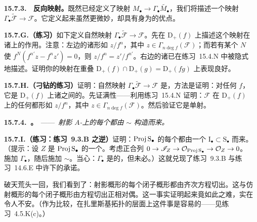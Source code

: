 \textbf{15.7.3.}\ \hard\ \textbf{反向映射。}\quad 既然已经定义了\trSaturation{}映射 $M_\bullet\to\Gamma_\bullet\widetilde{M_\bullet}$，我们将描述一个映射 $\Gamma_\bullet\widetilde{\mathscr{F}}\to\mathscr{F}$。它定义起来虽然更微妙，却具有身为\trIsomorphism{}的优点。

\textbf{15.7.G.（练习）}\quad 如下定义自然映射 $\Gamma_\bullet\widetilde{\mathscr{F}}\to\mathscr{F}$。先在 $\mathrm{D}_+(f)$ 上描述这个映射在诸\trSection{}上的作用。注意：左边的诸\trSection{}形如 $z/f^n$，其中 $z\in\Gamma_{n\deg f}(\mathscr{F})$；而若有某个 $N$ 使 $f^N(f^{n'}z-f^nz')=0$，则 $z/f^n=z'/f^{n'}$。右边的诸\trSection{}已在\mbox{练习~15.4.N} 中被隐式地描述。证明你的映射在重叠 $\mathrm{D}_+(f)\cap\mathrm{D}_+(g)=\mathrm{D}_+(fg)$ 上表现良好。

\textbf{15.7.H.（刁钻的练习）}\quad 证明：自然映射 $\Gamma_\bullet\widetilde{\mathscr{F}}\to\mathscr{F}$ 是\trIsomorphism，方法是证明：对任何 $f$，它是 $\mathrm{D}_+(f)$ 上诸\trSection{}之间的\trIsomorphism。先证满性——利用\mbox{练习~15.4.N} 证明：$\mathscr{F}$ 在 $\mathrm{D}_+(f)$ 上的任何\trSection{}都形如 $z/f^n$，其中 $z\in\Gamma_{n\deg f}(\mathscr{F})$。然后验证它是单射。

\textbf{15.7.4.\ \trhCorollary{}。}\ ——\ \emph{射影 $A$-\trScheme{}上的每个\trQCSheaf{}都由 $\sim$ 构造而来。}

\textbf{15.7.I.（练习：\mbox{练习~9.3.B} 之逆）}\quad 证明：$\operatorname{Proj} \mathrm{S}_\bullet$ 的每个\trClosedSubscheme{}都由一个\trHomogeneous\trIdeal{} $\mathrm{I}_\bullet\subset\mathrm{S}_\bullet$ 而来。（提示：设 $Z$ 是 $\operatorname{Proj} \mathrm{S}_\bullet$ 的一个\trClosedSubscheme。考虑正合列 $0\to\mathscr{I}_Z\to\mathcal{O}_{\operatorname{Proj} \mathrm{S}_\bullet}\to\mathcal{O}_Z\to 0$。施加 $\Gamma_\bullet$，随后施加 $\sim$。当心：$\Gamma_\bullet$ 是\trLeftExact{}的，但未必\trExact。）这就兑现了\mbox{练习~9.3.B} 与\mbox{练习~14.6.E} 中许下的承诺。

破天荒头一回，我们看到了：射影概形的每个闭子概形都由齐次方程切出。这与仿射概形的每个闭子概形由方程切出正相对偶。这一事实证明起来竟如此之难，实在令人不安。（作为比较，在扎里斯基拓扑的层面上这件事是容易的——见\mbox{练习~4.5.K(c)}。）

